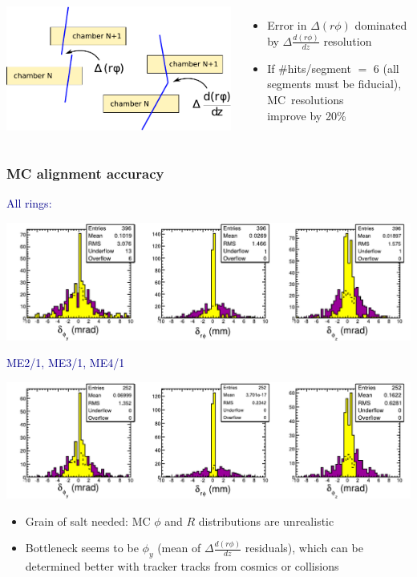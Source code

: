 \documentclass[compress]{beamer}
\begin{document}
\begin{frame}
\begin{columns}
\includegraphics[width=\linewidth]{residuals_diagrams.pdf}

\begin{itemize}
\item Error in $\Delta (r\phi)$ dominated by $\Delta \frac{d(r\phi)}{dz}$ resolution

\item If \#hits/segment $=$ 6 (all segments must be fiducial), \mbox{MC resolutions\hspace{-1 cm}} \\ improve by 20\%
\end{itemize}
\end{columns}
\end{frame}

\begin{frame}
\frametitle{MC alignment accuracy}

\textcolor{darkblue}{All rings:}

\includegraphics[width=0.9\linewidth]{MCBeamHalo-all_align_step6.pdf}

\vspace{0.2 cm}
\textcolor{darkblue}{ME2/1, ME3/1, ME4/1}

\includegraphics[width=0.9\linewidth]{MCBeamHalo-inner_align_step6.pdf}

\begin{itemize}
\item Grain of salt needed: MC $\phi$ and $R$ distributions are unrealistic

\item Bottleneck seems to be $\phi_y$ (mean of $\Delta \frac{d(r\phi)}{dz}$ residuals), which can be determined better with tracker tracks from cosmics or collisions
\end{itemize}
\end{frame}
\end{document}
